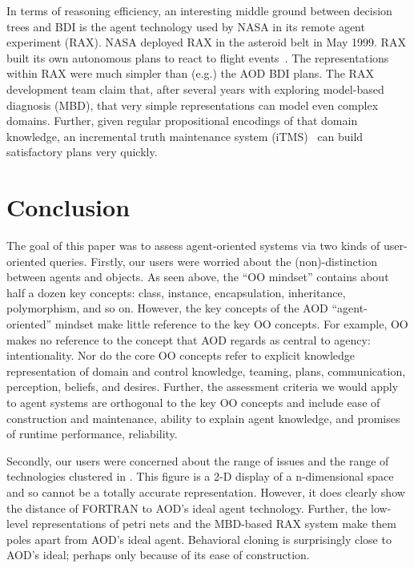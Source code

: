 In terms of reasoning efficiency, an interesting middle ground
between decision trees and BDI is the agent technology used by
NASA in its remote agent experiment (RAX). NASA deployed RAX in
the asteroid belt in May 1999. RAX  built its own autonomous plans
to react to flight events~\cite{musc98}. The representations
within RAX were much simpler than (e.g.) the AOD BDI plans. The
RAX development team claim that, after several years with
exploring model-based diagnosis (MBD), that very simple
representations can model even complex domains. Further, given
regular propositional encodings of that domain knowledge, an
incremental truth maintenance system (iTMS)~\cite{pand97} can
build satisfactory plans very quickly.


\section{Conclusion}

The goal of this paper was to assess agent-oriented systems via
two kinds of user-oriented queries. Firstly, our users were
worried about the (non)-distinction between agents and objects. As
seen above, the ``OO mindset'' contains about half a dozen key
concepts: class, instance, encapsulation, inheritance,
polymorphism, and so on. However, the key concepts of  the AOD
``agent-oriented'' mindset make little reference to the key OO
concepts. For example, OO makes no reference to the concept that
AOD regards as central to agency: intentionality. Nor do the core
OO concepts refer to explicit knowledge representation of domain
and control knowledge, teaming, plans, communication, perception,
beliefs, and desires.   Further, the assessment criteria we would
apply to agent systems are orthogonal to the key OO concepts  and
include ease of construction and maintenance, ability to explain
agent knowledge, and promises of runtime performance, reliability.



Secondly, our users were concerned about the range of issues and
the range of technologies clustered in  .  This
figure is a 2-D display of a n-dimensional space and so cannot be
a totally accurate representation. However, it does clearly show
the distance of FORTRAN to AOD's ideal agent technology. Further,
the low-level representations of petri nets and the MBD-based RAX
system make them poles apart from AOD's ideal agent. Behavioral
cloning is surprisingly close to AOD's ideal; perhaps only because
of its ease of construction.


